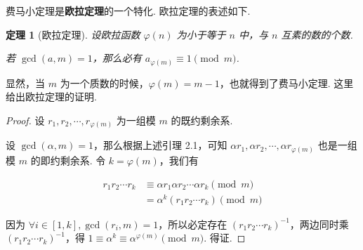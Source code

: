 \documentclass[a4paper]{article}
\newtheorem{theorem}{定理}[section]
\begin{document}
费马小定理是\textbf{欧拉定理}的一个特化. 欧拉定理的表述如下.

\begin{theorem}[欧拉定理]
    设欧拉函数 $\varphi(n)$ 为小于等于 $n$ 中，与 $n$ 互素的数的个数.

    若 $\gcd(a,m)=1$，那么必有 $a_{\varphi(m)}\equiv 1\pmod m$.
\end{theorem}

显然，当 $m$ 为一个质数的时候，$\varphi(m)=m-1$，也就得到了费马小定理. 这里给出欧拉定理的证明.

\begin{proof}
    设 $r_1,r_2,\cdots,r_{\varphi(m)}$ 为一组模 $m$ 的既约剩余系. 

    设 $\gcd(\alpha,m)=1$，那么根据上述引理 2.1，可知 $\alpha r_1,\alpha r_2,\cdots,\alpha r_{\varphi(m)}$
    也是一组模 $m$ 的即约剩余系. 令 $k=\varphi(m)$，我们有

    \begin{equation*}
        \begin{split}
            r_1r_2\cdots r_k&\equiv \alpha r_1\alpha r_2\cdots \alpha r_k \pmod m\\
            &=\alpha^k(r_1r_2\cdots r_k)\pmod m
        \end{split}
    \end{equation*}

    因为 $\forall i\in[1,k],\gcd(r_i,m)=1$，所以必定存在 $(r_1r_2\cdots r_k)^{-1}$，两边同时乘 $(r_1r_2
    \cdots r_k)^{-1}$，得 $1\equiv \alpha^k \equiv\alpha^{\varphi(m)}\pmod m$. 得证. 

\end{proof}
\end{document}
